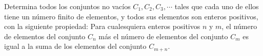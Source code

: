 Determina todos los conjuntos no vacíos $C_1, C_2, C_3, \cdots $ tales que cada uno de ellos tiene un número finito de elementos, y todos sus elementos son enteros positivos, con la siguiente propiedad: Para cualesquiera enteros positivos $n$ y $m$, el número de elementos del conjunto $C_n$ más el número de elementos del conjunto $C_m$ es igual a la suma de los elementos del conjunto $C_{m + n}$.